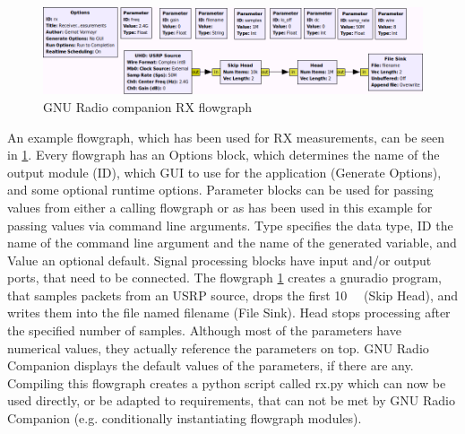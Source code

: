 \documentclass[12pt,a4paper,parskip=full]{scrartcl}
\begin{document}
\begin{figure}[htb]
    \centering
    \includegraphics[width=\linewidth]{grc}
    \caption{GNU Radio companion RX flowgraph}
    \label{fig:grc_rx}
\end{figure}
An example flowgraph, which has been used for RX measurements, can be seen in \cref{fig:grc_rx}.
Every flowgraph has an {\ttfamily Options} block, which determines the name of the output module ({\ttfamily ID}),
which GUI to use for the application ({\ttfamily Generate Options}), and some optional runtime options.
{\ttfamily Parameter} blocks can be used for passing values from either a calling flowgraph or as has
been used in this example for passing values via command line arguments. {\ttfamily Type} specifies the
data type, {\ttfamily ID} the name of the command line argument and the name of the generated variable,
and {\ttfamily Value} an optional default. Signal processing blocks have input and/or output ports, that
need to be connected. The flowgraph \cref{fig:grc_rx} creates a gnuradio program, that samples
packets from an USRP source, drops the first \SI{10}{\kilo\samples} ({\ttfamily Skip Head}), and writes
them into the file named {\ttfamily filename} ({\ttfamily File Sink}). {\ttfamily Head} stops processing after the
specified number of samples. Although most of the parameters have numerical values, they actually
reference the parameters on top. GNU Radio Companion displays the default values of the parameters,
if there are any. Compiling this flowgraph creates a python script called {\ttfamily rx.py} which
can now be used directly, or be adapted to requirements, that can not be met by GNU Radio Companion (e.g.
conditionally instantiating flowgraph modules).
\end{document}
